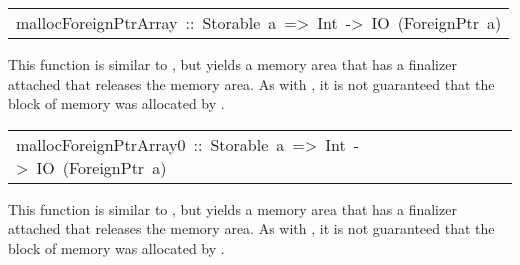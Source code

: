 \begin{haddockdesc}
\item[\begin{tabular}{@{}l}
mallocForeignPtrArray\ ::\ Storable\ a\ =>\ Int\ ->\ IO\ (ForeignPtr\ a)
\end{tabular}]\haddockbegindoc
This function is similar to ,
 but yields a memory area that has a finalizer attached that releases
 the memory area.  As with , it is not guaranteed that
 the block of memory was allocated by .
\par

\end{haddockdesc}
\begin{haddockdesc}
\item[\begin{tabular}{@{}l}
mallocForeignPtrArray0\ ::\ Storable\ a\ =>\ Int\ ->\ IO\ (ForeignPtr\ a)
\end{tabular}]\haddockbegindoc
This function is similar to ,
 but yields a memory area that has a finalizer attached that releases
 the memory area.  As with , it is not guaranteed that
 the block of memory was allocated by .
\par

\end{haddockdesc}